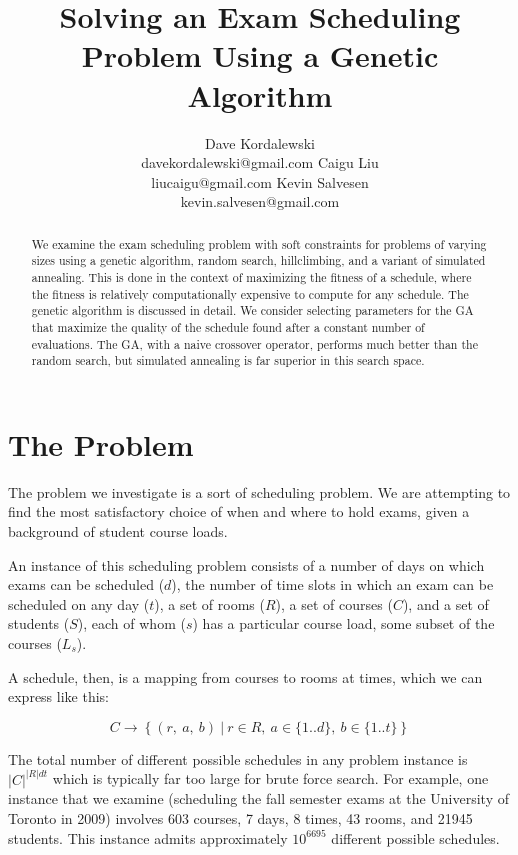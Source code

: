 \documentclass[letterpaper]{article}
\title{Solving an Exam Scheduling Problem Using a Genetic Algorithm}
\author{Dave Kordalewski \\ davekordalewski@gmail.com
   \And Caigu Liu \\liucaigu@gmail.com
   \And Kevin Salvesen \\ kevin.salvesen@gmail.com}
\begin{document}
\maketitle

\begin{abstract}
  We examine the exam scheduling problem with soft constraints for problems of varying
  sizes using a genetic algorithm, random search, hillclimbing, and a variant of simulated
  annealing. This is done in the context of maximizing the fitness of a schedule, where the
  fitness is relatively computationally expensive to compute for any schedule. The genetic
  algorithm is discussed in detail. We consider selecting parameters for the GA that
  maximize the quality of the schedule found after a constant number of evaluations. The
  GA, with a naive crossover operator, performs much better than the random search, but
  simulated annealing is far superior in this search space.
\end{abstract}

\section{The Problem}
  The problem we investigate is a sort of scheduling problem. 
  We are attempting to find the most satisfactory choice of when
  and where to hold exams, given a background of student course loads. 

  An instance of this scheduling problem consists of a number of days
  on which exams can be scheduled ($d$), the number of time slots in which
  an exam can be scheduled on any day ($t$), a set of rooms ($R$), a set of
  courses ($C$), and a set of students ($S$), each of whom ($s$) has a
  particular course load, some subset of the courses ($L_s$).

  A schedule, then, is a mapping from courses to rooms at times, 
  which we can express like this:
  
  \[ C \rightarrow \left\{(r,\ a,\ b)\ |\ r\in R,\ a\in \{1..d\},\ b\in \{1..t\}\right\} \]
  
  The total number of different possible schedules in any problem instance is
  $|C|^{|R|dt}$ which is typically far too large for brute force search.
  For example, one instance that we examine (scheduling the fall semester
  exams at the University of Toronto in 2009) involves 603 courses, 7 days,
  8 times, 43 rooms, and 21945 students. This instance admits approximately 
  $10^{6695}$ different possible schedules.
\end{document}
